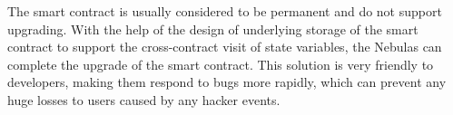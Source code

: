 
The smart contract is usually considered to be permanent and do not support upgrading. With the help of the design of underlying storage of the smart contract to support the cross-contract visit of state variables, the Nebulas can complete the upgrade of the smart contract. This solution is very friendly to developers, making them respond to bugs more rapidly, which can prevent any huge losses to users caused by any hacker events.





